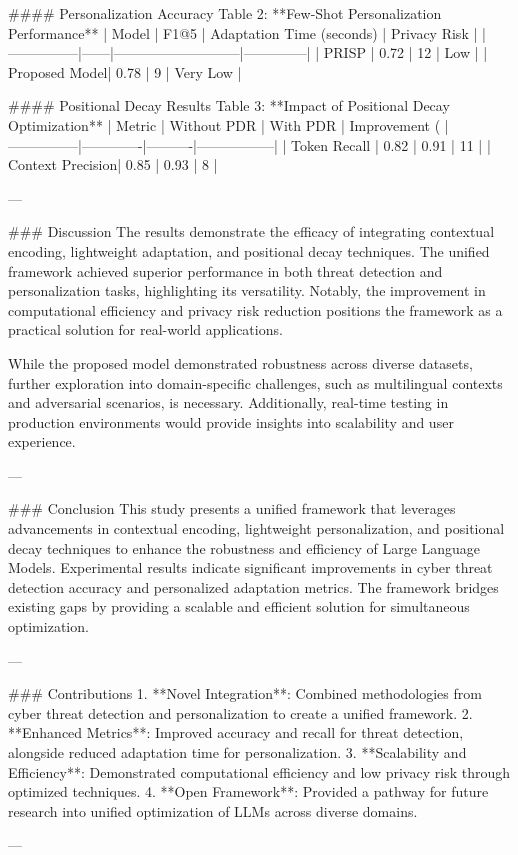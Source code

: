 #### Personalization Accuracy  
Table 2: **Few-Shot Personalization Performance**  
| Model         | F1@5 | Adaptation Time (seconds) | Privacy Risk |  
|---------------|------|---------------------------|--------------|  
| PRISP         | 0.72 | 12                        | Low          |  
| Proposed Model| 0.78 | 9                         | Very Low     |  

#### Positional Decay Results  
Table 3: **Impact of Positional Decay Optimization**  
| Metric        | Without PDR | With PDR | Improvement (%
|---------------|-------------|----------|-----------------|  
| Token Recall  | 0.82        | 0.91     | 11              |  
| Context Precision| 0.85     | 0.93     | 8               |  

---

### Discussion  
The results demonstrate the efficacy of integrating contextual encoding, lightweight adaptation, and positional decay techniques. The unified framework achieved superior performance in both threat detection and personalization tasks, highlighting its versatility. Notably, the improvement in computational efficiency and privacy risk reduction positions the framework as a practical solution for real-world applications.

While the proposed model demonstrated robustness across diverse datasets, further exploration into domain-specific challenges, such as multilingual contexts and adversarial scenarios, is necessary. Additionally, real-time testing in production environments would provide insights into scalability and user experience.

---

### Conclusion  
This study presents a unified framework that leverages advancements in contextual encoding, lightweight personalization, and positional decay techniques to enhance the robustness and efficiency of Large Language Models. Experimental results indicate significant improvements in cyber threat detection accuracy and personalized adaptation metrics. The framework bridges existing gaps by providing a scalable and efficient solution for simultaneous optimization.

---

### Contributions  
1. **Novel Integration**: Combined methodologies from cyber threat detection and personalization to create a unified framework.  
2. **Enhanced Metrics**: Improved accuracy and recall for threat detection, alongside reduced adaptation time for personalization.  
3. **Scalability and Efficiency**: Demonstrated computational efficiency and low privacy risk through optimized techniques.  
4. **Open Framework**: Provided a pathway for future research into unified optimization of LLMs across diverse domains.  

---